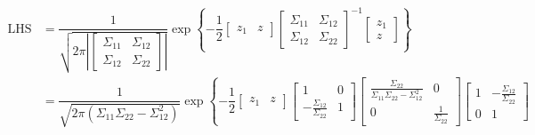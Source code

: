 \documentclass{article}
\begin{document}
\begin{itemize}
\begin{answer}
                    \begin{align*}
                        \text{LHS} &= \dfrac{1}{\sqrt{2\pi\left\lvert \begin{bmatrix}
                            \Sigma_{11} & \Sigma_{12} \\
                            \Sigma_{12} & \Sigma_{22}   
                        \end{bmatrix} \right\rvert}}\exp\left\{-\dfrac{1}{2}\begin{bmatrix}
                            z_{1} & z   
                        \end{bmatrix} \begin{bmatrix}
                            \Sigma_{11} & \Sigma_{12} \\
                            \Sigma_{12} & \Sigma_{22}   
                        \end{bmatrix}^{-1}\begin{bmatrix}
                            z_{1} \\
                            z       
                        \end{bmatrix}\right\}                                                         \\
                                   &= \dfrac{1}{\sqrt{2\pi(\Sigma_{11}\Sigma_{22} - \Sigma_{12}^{2})}}\exp\left\{-\dfrac{1}{2}\begin{bmatrix}
                                       z_{1} & z   
                                   \end{bmatrix}\begin{bmatrix}
                                       1                                & 0 \\
                                       -\frac{\Sigma_{12}}{\Sigma_{22}} & 1   
                                   \end{bmatrix}\begin{bmatrix}
                                       \frac{\Sigma_{22}}{\Sigma_{11}\Sigma_{22} - \Sigma_{12}^{2}} & 0                     \\
                                       0                                                            & \frac{1}{\Sigma_{22}}   
                                   \end{bmatrix}\begin{bmatrix}
                                       1 & -\frac{\Sigma_{12}}{\Sigma_{22}} \\
                                       0 & 1                                  

\end{bmatrix}
\end{align*}
\end{answer}
\end{itemize}
\end{document}

